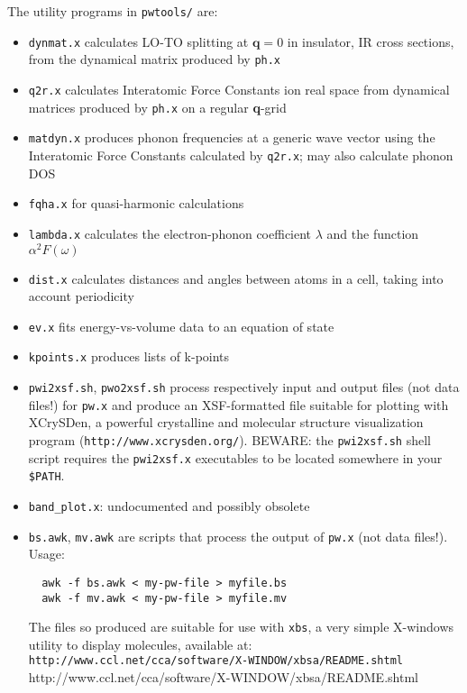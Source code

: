 \documentclass[12pt,a4paper]{article}
\begin{document}
The utility programs in \texttt{pwtools/} are:
\begin{itemize}
  \item \texttt{dynmat.x} calculates LO-TO splitting at
        $\mathbf{q}=0$ in insulator, IR cross sections, from the
        dynamical matrix produced by \texttt{ph.x}
  \item \texttt{q2r.x} calculates Interatomic Force Constants ion
        real space from dynamical matrices produced by
        \texttt{ph.x} on a regular \textbf{q}-grid
  \item \texttt{matdyn.x} produces phonon frequencies at a generic
        wave vector using the Interatomic Force Constants
        calculated by \texttt{q2r.x}; may also calculate phonon
        DOS
  \item \texttt{fqha.x} for quasi-harmonic calculations
  \item \texttt{lambda.x} calculates the electron-phonon coefficient
        $\lambda$ and the function $\alpha^2F(\omega)$
  \item \texttt{dist.x} calculates distances and angles between
        atoms in a cell, taking into account periodicity
  \item \texttt{ev.x} fits energy-vs-volume data to an equation of
        state
  \item \texttt{kpoints.x} produces lists of k-points
  \item \texttt{pwi2xsf.sh}, \texttt{pwo2xsf.sh} process
        respectively input and output files (not data files!) for
        \texttt{pw.x} and produce an XSF-formatted file suitable
        for plotting with XCrySDen, a powerful crystalline and
        molecular structure visualization program 
        (\texttt{http://www.xcrysden.org/}).
        BEWARE: the \texttt{pwi2xsf.sh} shell script requires the
        \texttt{pwi2xsf.x} executables to be located somewhere in
        your \texttt{\$PATH}.
  \item \texttt{band\_plot.x}: undocumented and possibly obsolete
  \item \texttt{bs.awk}, \texttt{mv.awk} are scripts that process
        the output of \texttt{pw.x} (not data files!).
        Usage:
\begin{verbatim}
  awk -f bs.awk < my-pw-file > myfile.bs
  awk -f mv.awk < my-pw-file > myfile.mv
\end{verbatim}
        The files so produced are suitable for use with
        \texttt{xbs}, a very simple X-windows utility to display
        molecules, available at:\hfill\break
        \htmladdnormallink%
        {\texttt{http://www.ccl.net/cca/software/X-WINDOW/xbsa/README.shtml}}%
        {http://www.ccl.net/cca/software/X-WINDOW/xbsa/README.shtml}
\end{itemize}
\end{document}
